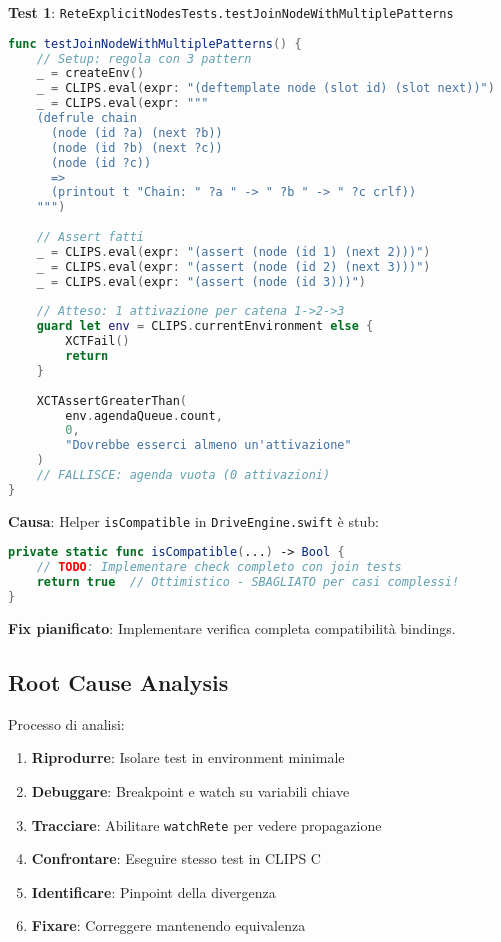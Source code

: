 \textbf{Test 1}: \texttt{ReteExplicitNodesTests.testJoinNodeWithMultiplePatterns}

\begin{lstlisting}[language=Swift]
func testJoinNodeWithMultiplePatterns() {
    // Setup: regola con 3 pattern
    _ = createEnv()
    _ = CLIPS.eval(expr: "(deftemplate node (slot id) (slot next))")
    _ = CLIPS.eval(expr: """
    (defrule chain
      (node (id ?a) (next ?b))
      (node (id ?b) (next ?c))
      (node (id ?c))
      =>
      (printout t "Chain: " ?a " -> " ?b " -> " ?c crlf))
    """)
    
    // Assert fatti
    _ = CLIPS.eval(expr: "(assert (node (id 1) (next 2)))")
    _ = CLIPS.eval(expr: "(assert (node (id 2) (next 3)))")
    _ = CLIPS.eval(expr: "(assert (node (id 3)))")
    
    // Atteso: 1 attivazione per catena 1->2->3
    guard let env = CLIPS.currentEnvironment else {
        XCTFail()
        return
    }
    
    XCTAssertGreaterThan(
        env.agendaQueue.count,
        0,
        "Dovrebbe esserci almeno un'attivazione"
    )
    // FALLISCE: agenda vuota (0 attivazioni)
}
\end{lstlisting}

\textbf{Causa}: Helper \texttt{isCompatible} in \texttt{DriveEngine.swift} è stub:

\begin{lstlisting}[language=Swift]
private static func isCompatible(...) -> Bool {
    // TODO: Implementare check completo con join tests
    return true  // Ottimistico - SBAGLIATO per casi complessi!
}
\end{lstlisting}

\textbf{Fix pianificato}: Implementare verifica completa compatibilità bindings.

\subsection{Root Cause Analysis}

Processo di analisi:

\begin{enumerate}
\item \textbf{Riprodurre}: Isolare test in environment minimale
\item \textbf{Debuggare}: Breakpoint e watch su variabili chiave
\item \textbf{Tracciare}: Abilitare \texttt{watchRete} per vedere propagazione
\item \textbf{Confrontare}: Eseguire stesso test in CLIPS C
\item \textbf{Identificare}: Pinpoint della divergenza
\item \textbf{Fixare}: Correggere mantenendo equivalenza
\end{enumerate}


